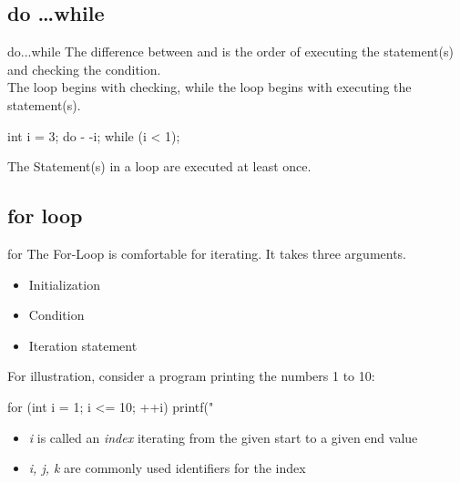 \documentclass[10pt,graphics,aspectratio=169,table]{beamer}
\begin{document}
\subsection{do \ldots while}

\begin{frame}[fragile]{do...while}
    The difference between  and  is the order of executing the statement(s) and checking the condition.\\
    \bigskip
    The  loop begins with checking, while the  loop begins with executing the statement(s).
    \begin{codeblock}
int i = 3;
do {
    - -i;
} while (i < 1);
\end{codeblock}
    \bigskip
    The Statement(s) in a  loop are executed at least once.
\end{frame}

\subsection{for loop}

\begin{frame}[fragile]{for}
    The For-Loop is comfortable for iterating. It takes three arguments.
    \begin{itemize}
        \item Initialization
        \item Condition
        \item Iteration statement
    \end{itemize}
    \bigskip
    For illustration, consider a program printing the numbers 1 to 10:
    \begin{codeblock}
for (int i = 1; i <= 10; ++i){
    printf("%
}
\end{codeblock}
    \begin{itemize}
        \item \textit{i} is called an \textit{index} iterating from the given start to a given end value
        \item \textit{i, j, k} are commonly used identifiers for the index
    \end{itemize}
\end{frame}
\end{document}
